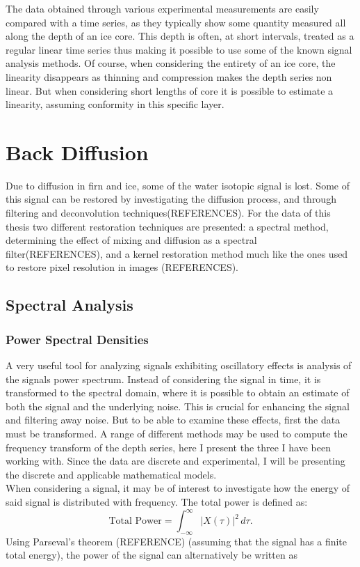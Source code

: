 \documentclass[../../CompleteThesis/Complete_1stDraft]{subfiles}
\begin{document}
The data obtained through various experimental measurements are easily compared with a time series, as they typically show some quantity measured all along the depth of an ice core. This depth is often, at short intervals, treated as a regular linear time series thus making it possible to use some of the known signal analysis methods. Of course, when considering the entirety of an ice core, the linearity disappears as thinning and compression makes the depth series non linear. But when considering short lengths of core it is possible to estimate a linearity, assuming conformity in this specific layer. 

\section[Back Diffusion][Back Diffusion]{Back Diffusion}

Due to diffusion in firn and ice, some of the water isotopic signal is lost. Some of this signal can be restored by investigating the diffusion process, and through filtering and deconvolution techniques(REFERENCES).
For the data of this thesis two different restoration techniques are presented: a spectral method, determining the effect of mixing and diffusion as a spectral filter(REFERENCES), and a kernel restoration method much like the ones used to restore pixel resolution in images (REFERENCES). 
\subsection[Spectral Analysis][Spectral Analysis]{Spectral Analysis}

\subsubsection[PSD][PSD]{Power Spectral Densities}
A very useful tool for analyzing signals exhibiting oscillatory effects is analysis of the signals power spectrum. Instead of considering the signal in time, it is transformed to the spectral domain, where it is possible to obtain an estimate of both the signal and the underlying noise. This is crucial for enhancing the signal and filtering away noise. But to be able to examine these effects, first the data must be transformed. A range of different methods may be used to compute the frequency transform of the depth series, here I present the three I have been working with. Since the data are discrete and experimental, I will be presenting the discrete and applicable mathematical models.\\
When considering a signal, it may be of interest to investigate how the energy of said signal is distributed with frequency. The total power is defined as:
\begin{equation}
	\text{Total Power} = \int_{-\infty}^{\infty} |X(\tau)|^2 \, d\tau.
	\label{Eq:SignalEnergy}
\end{equation}
Using Parseval's theorem (REFERENCE) (assuming that the signal has a finite total energy), the power of the signal can alternatively be written as
\end{document}
